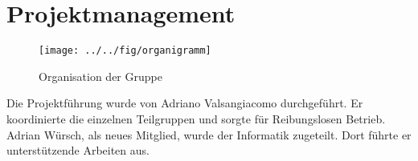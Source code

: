 \section{Projektmanagement}

\begin{figure}[h!]
	\centering
	\texttt{[image: ../../fig/organigramm]}
	\caption{Organisation der Gruppe}
	\label{fig:Organigramm}
\end{figure}

Die Projektführung wurde von Adriano Valsangiacomo durchgeführt. Er koordinierte die einzelnen Teilgruppen und sorgte für Reibungslosen Betrieb. Adrian Würsch, als neues Mitglied, wurde der Informatik zugeteilt. Dort führte er unterstützende Arbeiten aus.


\newpage

\newpage

\newpage